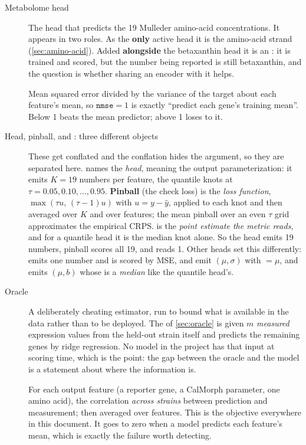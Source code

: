 \begin{description}
\item[Metabolome head] The head that predicts the 19 Mulleder amino-acid concentrations.
  It appears in two roles. As the \textbf{only} active head it is the amino-acid strand
  (\cref{sec:amino-acid}). Added \textbf{alongside} the betaxanthin head it is an
  : it is trained and scored, but the number being reported is still
  betaxanthin, and the question is whether sharing an encoder with it helps.

\item[] Mean squared error divided by the variance of the target about each
  feature's mean, so $\texttt{nmse} = 1$ is exactly ``predict each gene's training mean''.
  Below 1 beats the mean predictor; above 1 loses to it.

\item[Head, pinball, and : three different objects] These get conflated and
  the conflation hides the argument, so they are separated here.
  \textbf{} names the \emph{head}, meaning the output
  parameterization: it emits $K = 19$ numbers per feature, the quantile knots at
  $\tau = 0.05, 0.10, \ldots, 0.95$.
  \textbf{Pinball} (the check loss) is the \emph{loss function},
  $\max(\tau u,\, (\tau - 1)u)$ with $u = y - \hat y$, applied to each knot and then
  averaged over $K$ and over features; the mean pinball over an even $\tau$ grid
  approximates the empirical CRPS.
  \textbf{} is the \emph{point estimate the metric reads}, and for a
  quantile head it is the median knot alone. So the head emits 19 numbers, pinball scores
  all 19, and  reads 1. Other heads set this differently:
   emits one number and is scored by MSE,  and  emit
  $(\mu, \sigma)$ with  $= \mu$, and  emits $(\mu, b)$
  whose  is a \emph{median} like the quantile head's.

\item[Oracle] A deliberately cheating estimator, run to bound what is available in the data
  rather than to be deployed. The  of \cref{sec:oracle} is given $m$
  \emph{measured} expression values from the held-out strain itself and predicts the
  remaining genes by ridge regression. No model in the project has that input at scoring
  time, which is the point: the gap between the oracle and the model is a statement about
  where the information is.

\item[] For each output feature (a reporter gene, a CalMorph
  parameter, one amino acid), the correlation \emph{across strains} between prediction and
  measurement; then averaged over features. This is the objective everywhere in this
  document. It goes to zero when a model predicts each feature's mean, which is exactly the
  failure worth detecting.


\end{description}
